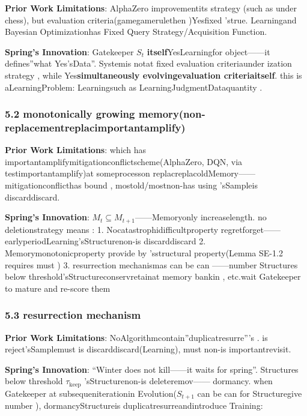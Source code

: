 \documentclass[
  12pt,
]{article}
\begin{document}
\textbf{Prior Work Limitations}: AlphaZero
improvementits strategy (such as under chess), but evaluation criteria(gamegamerulethen )Yesfixed 'strue. Learningand Bayesian Optimizationhas Fixed Query Strategy/Acquisition Function. 

\textbf{Spring's Innovation}: Gatekeeper \(S_t\)
\textbf{itself}YesLearningfor object------it defines''what Yes'sData''. Systemis notat fixed evaluation criteriaunder ization strategy , while Yes\textbf{simultaneously evolvingevaluation criteriaitself}. this is aLearningProblem: Learningsuch as LearningJudgmentDataquantity . 

\subsubsection{5.2
monotonically growing memory(non-replacementreplacimportantamplify)}\label{ux5355ux8c03ux589eux957fux8bb0ux5fc6ux4e0dux66ffux6362ux91cdux653e}

\textbf{Prior Work Limitations}:
which has importantamplifymitigationconflictscheme(AlphaZero, DQN, via testimportantamplify)at someprocesson replacreplacoldMemory------mitigationconflicthas bound , mostold/mostnon-has using 'sSampleis discarddiscard. 

\textbf{Spring's Innovation}:
\(M_t \subseteq M_{t+1}\)------Memoryonly increaselength. no deletionstrategy means :  1.
Nocatastrophidifficultproperty regretforget------earlyperiodLearning'sStructurenon-is discarddiscard 2.
Memorymonotonicproperty provide by 'sstructural property(Lemma SE-1.2 requires must ) 3.
resurrection mechanismas can be can ------number Structures below threshold'sStructureconservretainat memory bankin , etc.wait
Gatekeeper to mature and re-score them

\subsubsection{5.3 resurrection mechanism}\label{ux590dux6d3bux673aux5236}

\textbf{Prior Work Limitations}:
NoAlgorithmcontain''duplicatresurre'''s  . is reject'sSamplemust is discarddiscard(Learning), must non-is importantrevisit. 

\textbf{Spring's Innovation}: ``Winter does not kill------it waits for spring''. Structures below threshold
\(\tau_{\text{keep}}\) 'sStructurenon-is deleteremov------ dormancy. when  Gatekeeper
at subsequeniterationin Evolution(\(S_{t+1}\)
can be can for Structuregive number ), dormancyStructureis duplicatresurreandintroduce Training: 
\end{document}
